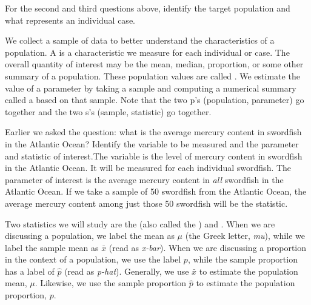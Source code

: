 \begin{exercisewrap}
\begin{nexercise} \label{identifyingThePopulationForTwoQuestionsInPopAndSampSubsection}
For the second and third questions above, identify the target population and what represents an individual case.\footnotemark
\end{nexercise}
\end{exercisewrap}

\D{\newpage}

We collect a sample of data to better understand the characteristics of a population. A  is a characteristic we measure for each individual or case. The overall quantity of interest may be the mean, median, proportion, or some other summary of a population. These population values are called . We estimate the value of a parameter by taking a sample and computing a numerical summary called a  based on that sample. Note that the two p's (population, parameter) go together and the two s's (sample, statistic) go together.

\begin{examplewrap}
\begin{nexample}{Earlier we asked the question: what is the average mercury content in swordfish in the Atlantic Ocean? Identify the variable to be measured and the parameter and statistic of interest.}The variable is the level of mercury content in swordfish in the Atlantic Ocean. It will be measured for each individual swordfish. The parameter of interest is the average mercury content in \emph{all} swordfish in the Atlantic Ocean. If we take a sample of 50 swordfish from the Atlantic Ocean, the average mercury content among just those 50 swordfish will be the statistic.
\end{nexample}
\end{examplewrap}

Two statistics we will study are the  (also called the ) and . When we are discussing a population, we label the mean as $\mu$ (the Greek letter, \emph{mu}), while we label the sample mean as $\bar{x}$ (read as \emph{x-bar}). When we are discussing a proportion in the context of a population, we use the label $p$, while the sample proportion has a label of $\hat{p}$ (read as \emph{p-hat}). Generally, we use $\bar{x}$ to estimate the population mean, $\mu$. Likewise, we use the sample proportion $\hat{p}$ to estimate the population proportion, $p$.

